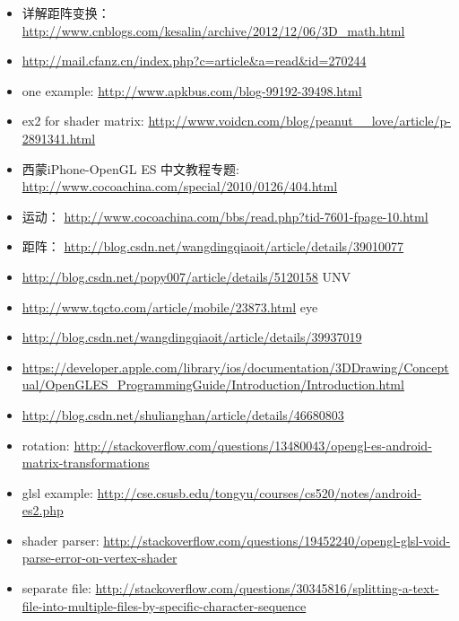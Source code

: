 \documentclass[9pt,b5paper]{article}
\begin{document}
\begin{itemize}
\item 详解距阵变换：\url{http://www.cnblogs.com/kesalin/archive/2012/12/06/3D_math.html}
\item \url{http://mail.cfanz.cn/index.php?c=article&a=read&id=270244}
\item one example: \url{http://www.apkbus.com/blog-99192-39498.html}
\item ex2 for shader matrix: \url{http://www.voidcn.com/blog/peanut__love/article/p-2891341.html}
\item 西蒙iPhone-OpenGL ES 中文教程专题: \url{http://www.cocoachina.com/special/2010/0126/404.html}
\item 运动： \url{http://www.cocoachina.com/bbs/read.php?tid-7601-fpage-10.html}
\item 距阵： \url{http://blog.csdn.net/wangdingqiaoit/article/details/39010077}
\item \url{http://blog.csdn.net/popy007/article/details/5120158} UNV
\item \url{http://www.tqcto.com/article/mobile/23873.html} eye
\item \url{http://blog.csdn.net/wangdingqiaoit/article/details/39937019}
\item \url{https://developer.apple.com/library/ios/documentation/3DDrawing/Conceptual/OpenGLES_ProgrammingGuide/Introduction/Introduction.html}
\item \url{http://blog.csdn.net/shulianghan/article/details/46680803}
\item rotation: \url{http://stackoverflow.com/questions/13480043/opengl-es-android-matrix-transformations}
\item glsl example: \url{http://cse.csusb.edu/tongyu/courses/cs520/notes/android-es2.php}
\item shader parser: \url{http://stackoverflow.com/questions/19452240/opengl-glsl-void-parse-error-on-vertex-shader}
\item separate file: \url{http://stackoverflow.com/questions/30345816/splitting-a-text-file-into-multiple-files-by-specific-character-sequence}
\end{itemize}
\end{document}
